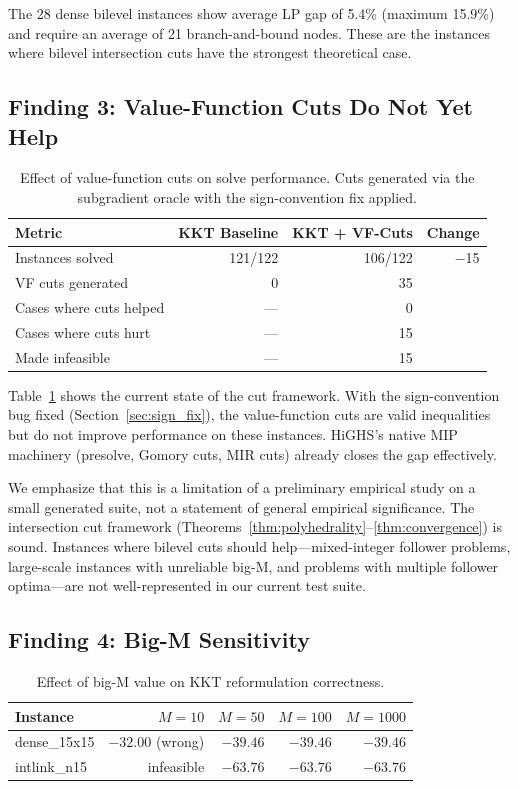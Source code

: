 \documentclass[11pt]{article}
\begin{document}
The 28 dense bilevel instances show average LP gap of 5.4\% (maximum 15.9\%)
and require an average of 21 branch-and-bound nodes. These are the instances
where bilevel intersection cuts have the strongest theoretical case.

\subsection{Finding 3: Value-Function Cuts Do Not Yet Help}

\begin{table}[t]
\centering
\caption{Effect of value-function cuts on solve performance.
Cuts generated via the subgradient oracle with the sign-convention
fix applied.}
\label{tab:cuts}
\begin{tabular}{lrrr}
\toprule
Metric & KKT Baseline & KKT + VF-Cuts & Change \\
\midrule
Instances solved & 121/122 & 106/122 & $-$15 \\
VF cuts generated & 0 & 35 & \\
Cases where cuts helped & --- & 0 & \\
Cases where cuts hurt & --- & 15 & \\
\quad Made infeasible & --- & 15 & \\
\bottomrule
\end{tabular}
\end{table}

Table~\ref{tab:cuts} shows the current state of the cut framework.
With the sign-convention bug fixed (Section~\ref{sec:sign_fix}),
the value-function cuts are valid inequalities but do not improve
performance on these instances. HiGHS's native MIP machinery
(presolve, Gomory cuts, MIR cuts) already closes the gap effectively.

We emphasize that this is a limitation of a preliminary empirical study on a
small generated suite, not a statement of general empirical significance. The
intersection cut framework (Theorems~\ref{thm:polyhedrality}--\ref{thm:convergence}) is sound.
Instances where bilevel cuts should help---mixed-integer follower problems,
large-scale instances with unreliable big-M, and problems with multiple
follower optima---are not well-represented in our current test suite.

\subsection{Finding 4: Big-M Sensitivity}

\begin{table}[t]
\centering
\caption{Effect of big-M value on KKT reformulation correctness.}
\label{tab:bigm}
\begin{tabular}{lrrrr}
\toprule
Instance & $M{=}10$ & $M{=}50$ & $M{=}100$ & $M{=}1000$ \\
\midrule
dense\_15x15 & $-32.00$ (wrong) & $-39.46$ & $-39.46$ & $-39.46$ \\
intlink\_n15 & infeasible & $-63.76$ & $-63.76$ & $-63.76$ \\
\bottomrule
\end{tabular}
\end{table}
\end{document}
